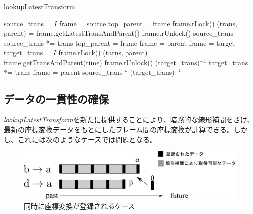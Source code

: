 \documentclass[a4paper]{jreport}	%
\begin{document}
\begin{algorithm}
  \caption{lookupLatestTransform}\label{algo:lookupLatestTransform}
\begin{algorithmic}[1]
	\State source\_trans = $I$
	\State frame = source
	\State top\_parent = frame
	\State frame.rLock()
	\State (trans, parent) = frame.getLatestTransAndParent() 
	\State frame.rUnlock()
	\State \Return source\_trans
	\EndIf
	\State source\_trans *= trans
	\State top\_parent = frame
	\State frame = parent
	\EndWhile
	\State frame = target
	\State target\_trans = $I$
	\State frame.rLock()
	\State (tarns, parent) = frame.getTransAndParent(time)
	\State frame.rUnlock()
	\State \Return (target\_trans)$^{-1}$
	\EndIf
	\State target\_trans *= trans
	\State frame = parent
	\EndWhile
	\State \Return source\_trans * (target\_trans)$^{-1}$
	\EndFunction
\end{algorithmic}
\end{algorithm}



\subsection{データの一貫性の確保}
\textit{lookupLatestTransform}を新たに提供することにより、暗黙的な線形補間をさけ、最新の座標変換データをもとにしたフレーム間の座標変換が計算できる。しかし、これには次のようなケースでは問題となる。

\begin{figure}[h] 
\centering
\includegraphics[width=12cm]{coming-same-time}
\caption{同時に座標変換が登録されるケース}
\label{fig:coming-same-time}
\end{figure}
\end{document}
